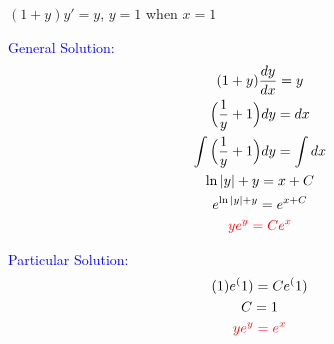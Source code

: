 \item $(1 + y)y'=y$, $y=1$ when $x=1$

\textcolor{blue}{
    \begin{minipage}[t]{0.45\textwidth}
        General Solution:
        \begin{gather*}
        (1 + y)\frac{dy}{dx}=y\\
        \Big(\frac{1}{y}+1\Big)dy=dx\\
        \int\Big(\frac{1}{y}+1\Big)dy=\int dx\\
        \ln|y|+y=x+C\\
        e^{\ln|y|+y}=e^{x+C}\\
        \textcolor{red}{
        ye^y=Ce^x
        }
        \end{gather*}
    \end{minipage}
    \hfill
    \begin{minipage}[t]{0.45\textwidth}
        Particular Solution:
        \begin{gather*}
        (1)e^(1)=Ce^(1)\\
        C=1\\
        \textcolor{red}{
        ye^y=e^x
        }
        \end{gather*}
    \end{minipage}
}